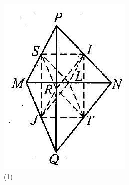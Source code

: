 \documentclass[10pt]{article}
\begin{document}
\includegraphics[max width=\textwidth, center]{2024_10_30_2c8f45efd4a519b08e1ag-117(1)}\\
(1)\\
\end{document}
